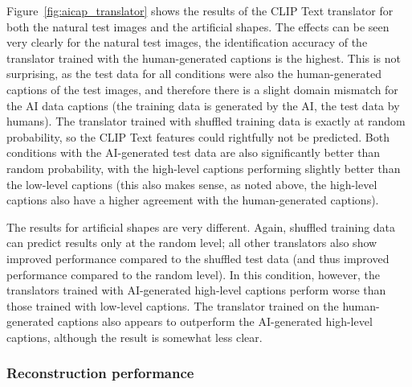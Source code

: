 Figure~\ref{fig:aicap_translator} shows the results of the CLIP Text translator for both the natural test images and the artificial shapes. The effects can be seen very clearly for the natural test images, the identification accuracy of the translator trained with the human-generated captions is the highest. This is not surprising, as the test data for all conditions were also the human-generated captions of the test images, and therefore there is a slight domain mismatch for the AI data captions (the training data is generated by the AI, the test data by humans). The translator trained with shuffled training data is exactly at random probability, so the CLIP Text features could rightfully not be predicted. Both conditions with the AI-generated test data are also significantly better than random probability, with the high-level captions performing slightly better than the low-level captions (this also makes sense, as noted above, the high-level captions also have a higher agreement with the human-generated captions). 

The results for artificial shapes are very different. Again, shuffled training data can predict results only at the random level; all other translators also show improved performance compared to the shuffled test data (and thus improved performance compared to the random level). In this condition, however, the translators trained with AI-generated high-level captions perform worse than those trained with low-level captions. The translator trained on the human-generated captions also appears to outperform the AI-generated high-level captions, although the result is somewhat less clear. 

\subsubsection{Reconstruction performance}


